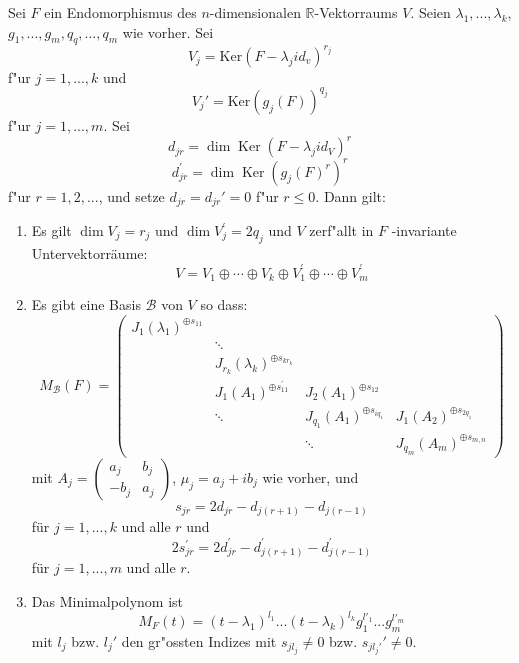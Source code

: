\documentclass[11pt, a4paper]{article}
\begin{document}
\begin{theorem}
Sei $F$ ein Endomorphismus des $n$-dimensionalen $\mathbb{R}$-Vektorraums $V$. Seien $\lambda_1, ..., \lambda_k$, $g_1, ..., g_m, q_q, ..., q_m$ wie vorher. Sei
$$
V_j = \mathrm{Ker}(F- \lambda_j id_v)^{r_j}
$$
f"ur $j = 1, ..., k$ und 
$$
V_j' = \mathrm{Ker}(g_j(F))^{q_j}
$$
f"ur $j = 1, ..., m$.
Sei 
$$
d_{j r}= \operatorname{dim} \operatorname{Ker}\left(F-\lambda_{j} i d_{V}\right)^{r}
$$
$$
d_{j r}^{\prime}=\operatorname{dim} \operatorname{Ker}\left(g_{j}(F)^{r}\right)^{r}
$$
f"ur $r = 1, 2, ...$, und setze $d_{jr} = d_{jr}' = 0$ f"ur $r \leq 0$. Dann gilt:
\begin{enumerate}
\item Es gilt \(\operatorname{dim} V_{j}=r_{j}\) und \(\operatorname{dim} V_{j}^{\prime}=2 q_{j}\) und \(V\) zerf"allt in $F$ -invariante Untervektorräume:
$$
V=V_{1} \oplus \cdots \oplus V_{k} \oplus V_{1}^{\prime} \oplus \cdots \oplus V_{m}^{\prime}
$$
\item Es gibt eine Basis $\mathcal{B}$ von $V$ so dass:
$$
M_\mathcal{B}(F)=
\left(\begin{array}{cccc}J_{1}\left(\lambda_{1}\right)^{\oplus s_{11}} & & & \\ 
& \ddots & \\ & J_{r_{k}}\left(\lambda_{k}\right)^{\oplus s_{k r_{k}}} & \\ 
& J_{1}\left(A_{1}\right)^{\oplus s_{11}^{\prime}} & J_{2}\left(A_{1}\right)^{\oplus s_{12}} & \\ 
& \ddots & J_{q_{1}}\left(A_{1}\right)^{\oplus s_{i q_{1}}} & J_{1}\left(A_{2}\right)^{\oplus s_{2 q_{1}}} \\ 
& & \ddots & J_{q_{m}}\left(A_{m}\right)^{\oplus s_{m, n}}
\end{array}\right)
$$
mit $A_j = \left(\begin{array}{cc}a_{j} & b_{j} \\ -b_{j} & a_{j}\end{array}\right)$, $\mu_j = a_j + i b_j$ wie vorher, und 
$$
s_{jr}=2 d_{j r}-d_{j(r+1)}-d_{j(r-1)}
$$
für $j=1, ..., k$ und alle $r$ und
$$
2 s_{j r}^{\prime}=2 d_{j r}^{\prime}-d_{j(r+1)}^{\prime}-d_{j(r-1)}^{\prime}
$$
für $j=1, ..., m$ und alle $r$.

\item Das Minimalpolynom ist 
$$
M_F(t) = (t - \lambda_1)^{l_1} ... (t - \lambda_k)^{l_k} g_1^{l'_1} ... g_m^{l'_m}
$$
mit $l_j$ bzw. $l_j'$ den gr"ossten Indizes mit $s_{jl_j}\neq 0$ bzw. $s_{jl_j'}' \neq 0$.

\end{enumerate}
\end{theorem}
\end{document}
